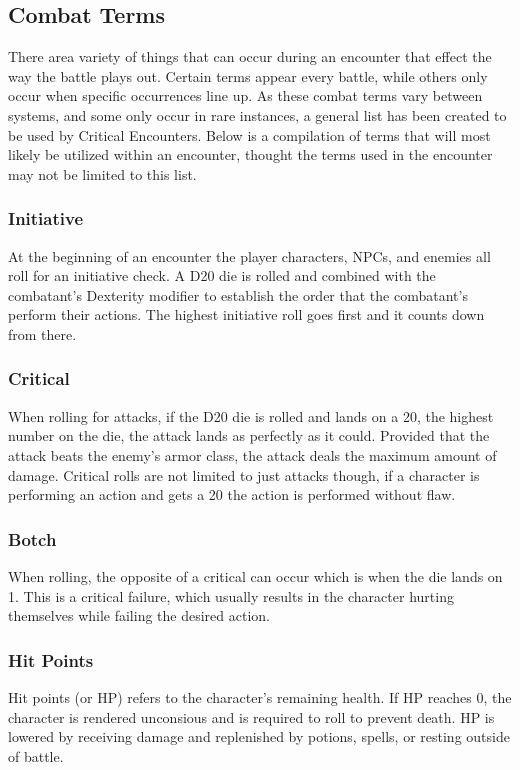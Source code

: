 \documentclass[12pt,a4paper]{report}
\begin{document}
		\newpage
		\subsection{Combat Terms}
			There area variety of things that can occur during an encounter that effect the way the battle plays out. Certain terms appear every battle, while others only occur when specific occurrences line up. As these combat terms vary between systems, and some only occur in rare instances, a general list has been created to be used by Critical Encounters. Below is a compilation of terms that will most likely be utilized within an encounter, thought the terms used in the encounter may not be limited to this list.
		\subsubsection{Initiative}
			At the beginning of an encounter the player characters, NPCs, and enemies all roll for an initiative check. A D20 die is rolled and combined with the combatant's Dexterity modifier to establish the order that the combatant's perform their actions. The highest initiative roll goes first and it counts down from there.
		\subsubsection{Critical}
			When rolling for attacks, if the D20 die is rolled and lands on a 20, the highest number on the die, the attack lands as perfectly as it could. Provided that the attack beats the enemy's armor class, the attack deals the maximum amount of damage. Critical rolls are not limited to just attacks though, if a character is performing an action and gets a 20 the action is performed without flaw.
		\subsubsection{Botch}
			When rolling, the opposite of a critical can occur which is when the die lands on 1. This is a critical failure, which usually results in the character hurting themselves while failing the desired action.
		\subsubsection{Hit Points}
			Hit points (or HP) refers to the character's remaining health. If HP reaches 0, the character is rendered unconsious and is required to roll to prevent death. HP is lowered by receiving damage and replenished by potions, spells, or resting outside of battle.
\end{document}
